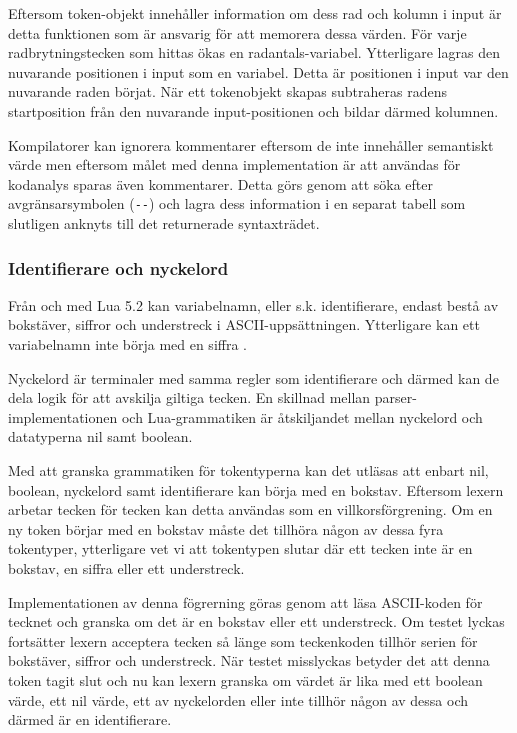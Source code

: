 Eftersom token-objekt innehåller information om dess rad och kolumn i input är
detta funktionen som är ansvarig för att memorera dessa värden. För varje
radbrytningstecken som hittas ökas en radantals-variabel. Ytterligare lagras den
nuvarande positionen i input som en variabel. Detta är positionen i input var
den nuvarande raden börjat. När ett tokenobjekt skapas subtraheras radens
startposition från den nuvarande input-positionen och bildar därmed kolumnen.

Kompilatorer kan ignorera kommentarer eftersom de inte innehåller semantiskt
värde men eftersom målet med denna implementation är att användas för
kodanalys sparas även kommentarer. Detta görs genom att söka efter
avgränsarsymbolen (\verb+--+) och lagra dess information i en separat tabell
som slutligen anknyts till det returnerade syntaxträdet.

\subsubsection{Identifierare och nyckelord}

Från och med Lua 5.2 kan variabelnamn, eller s.k. identifierare, endast bestå av
bokstäver, siffror och understreck i ASCII-uppsättningen. Ytterligare kan ett
variabelnamn inte börja med en siffra \citep{luaref}.

Nyckelord är terminaler med samma regler som identifierare och därmed kan de
dela logik för att avskilja giltiga tecken. En skillnad mellan
parser-implementationen och Lua-grammatiken är åtskiljandet mellan nyckelord
och datatyperna nil samt boolean.

Med att granska grammatiken för tokentyperna kan det utläsas att enbart nil,
boolean, nyckelord samt identifierare kan börja med en bokstav. Eftersom
lexern arbetar tecken för tecken kan detta användas som en villkorsförgrening.
Om en ny token börjar med en bokstav måste det tillhöra någon av dessa fyra
tokentyper, ytterligare vet vi att tokentypen slutar där ett tecken inte är en
bokstav, en siffra eller ett understreck.

Implementationen av denna fögrerning göras genom att läsa ASCII-koden för
tecknet och granska om det är en bokstav eller ett understreck. Om testet
lyckas fortsätter lexern acceptera tecken så länge som teckenkoden tillhör
serien för bokstäver, siffror och understreck. När testet misslyckas betyder
det att denna token tagit slut och nu kan lexern granska om värdet är lika med
ett boolean värde, ett nil värde, ett av nyckelorden eller inte tillhör någon
av dessa och därmed är en identifierare.

